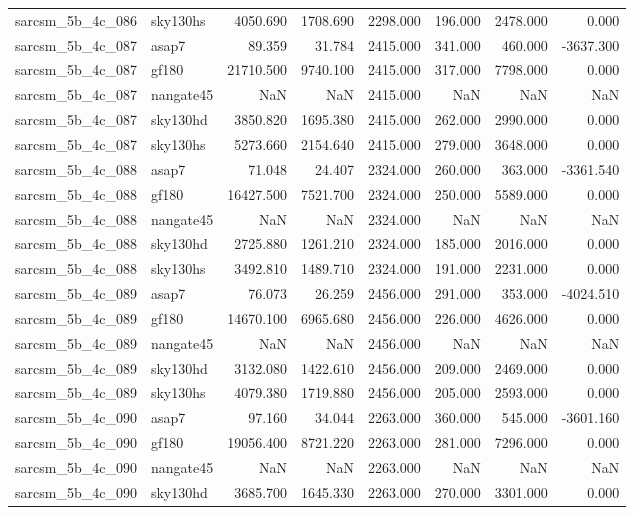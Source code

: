 \begin{tabular}{llrrrrrr}
sarcsm\_5b\_4c\_086 & sky130hs & 4050.690 & 1708.690 & 2298.000 & 196.000 & 2478.000 & 0.000 \\
sarcsm\_5b\_4c\_087 & asap7 & 89.359 & 31.784 & 2415.000 & 341.000 & 460.000 & -3637.300 \\
sarcsm\_5b\_4c\_087 & gf180 & 21710.500 & 9740.100 & 2415.000 & 317.000 & 7798.000 & 0.000 \\
sarcsm\_5b\_4c\_087 & nangate45 & NaN & NaN & 2415.000 & NaN & NaN & NaN \\
sarcsm\_5b\_4c\_087 & sky130hd & 3850.820 & 1695.380 & 2415.000 & 262.000 & 2990.000 & 0.000 \\
sarcsm\_5b\_4c\_087 & sky130hs & 5273.660 & 2154.640 & 2415.000 & 279.000 & 3648.000 & 0.000 \\
sarcsm\_5b\_4c\_088 & asap7 & 71.048 & 24.407 & 2324.000 & 260.000 & 363.000 & -3361.540 \\
sarcsm\_5b\_4c\_088 & gf180 & 16427.500 & 7521.700 & 2324.000 & 250.000 & 5589.000 & 0.000 \\
sarcsm\_5b\_4c\_088 & nangate45 & NaN & NaN & 2324.000 & NaN & NaN & NaN \\
sarcsm\_5b\_4c\_088 & sky130hd & 2725.880 & 1261.210 & 2324.000 & 185.000 & 2016.000 & 0.000 \\
sarcsm\_5b\_4c\_088 & sky130hs & 3492.810 & 1489.710 & 2324.000 & 191.000 & 2231.000 & 0.000 \\
sarcsm\_5b\_4c\_089 & asap7 & 76.073 & 26.259 & 2456.000 & 291.000 & 353.000 & -4024.510 \\
sarcsm\_5b\_4c\_089 & gf180 & 14670.100 & 6965.680 & 2456.000 & 226.000 & 4626.000 & 0.000 \\
sarcsm\_5b\_4c\_089 & nangate45 & NaN & NaN & 2456.000 & NaN & NaN & NaN \\
sarcsm\_5b\_4c\_089 & sky130hd & 3132.080 & 1422.610 & 2456.000 & 209.000 & 2469.000 & 0.000 \\
sarcsm\_5b\_4c\_089 & sky130hs & 4079.380 & 1719.880 & 2456.000 & 205.000 & 2593.000 & 0.000 \\
sarcsm\_5b\_4c\_090 & asap7 & 97.160 & 34.044 & 2263.000 & 360.000 & 545.000 & -3601.160 \\
sarcsm\_5b\_4c\_090 & gf180 & 19056.400 & 8721.220 & 2263.000 & 281.000 & 7296.000 & 0.000 \\
sarcsm\_5b\_4c\_090 & nangate45 & NaN & NaN & 2263.000 & NaN & NaN & NaN \\
sarcsm\_5b\_4c\_090 & sky130hd & 3685.700 & 1645.330 & 2263.000 & 270.000 & 3301.000 & 0.000 \\

\end{tabular}
